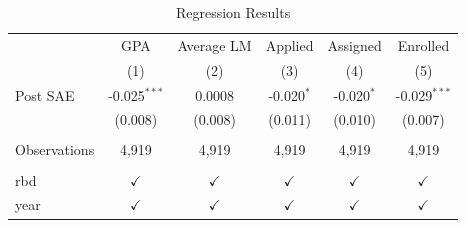 \begin{table}[htbp]
   \caption{\label{tab:reg_results} Regression Results}
   \bigskip
   \centering
   \begin{tabular}{lccccc}
      \toprule
                   & GPA            & Average LM    & Applied       & Assigned      & Enrolled\\  
                   & (1)            & (2)           & (3)           & (4)           & (5)\\  
      \midrule 
      Post SAE     & -0.025$^{***}$ & 0.0008        & -0.020$^{*}$  & -0.020$^{*}$  & -0.029$^{***}$\\   
                   & (0.008)        & (0.008)       & (0.011)       & (0.010)       & (0.007)\\   
       \\
      Observations & 4,919          & 4,919         & 4,919         & 4,919         & 4,919\\  
       \\
      rbd          & $\checkmark$   & $\checkmark$  & $\checkmark$  & $\checkmark$  & $\checkmark$\\   
      year         & $\checkmark$   & $\checkmark$  & $\checkmark$  & $\checkmark$  & $\checkmark$\\   
      \bottomrule
   \end{tabular}
\end{table}
